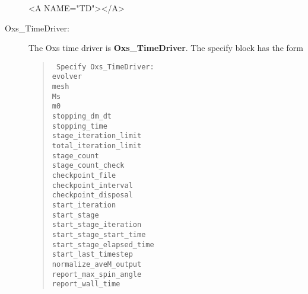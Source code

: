 \begin{description}
\begin{rawhtml}<A NAME="TD"></A>\end{rawhtml}%
%
\item[Oxs\_TimeDriver:\label{item:TimeDriver}]
The Oxs time driver is \textbf{Oxs\_TimeDriver}.  The specify block has
the form
\begin{latexonly}
\begin{quote}\tt
Specify Oxs\_TimeDriver: \ocb\\
 \bi evolver \\
 \bi mesh \\
 \bi Ms \\
 \bi m0 \\
 \bi stopping\_dm\_dt \\
 \bi stopping\_time \\
 \bi stage\_iteration\_limit \\
 \bi total\_iteration\_limit \\
 \bi stage\_count \\
 \bi stage\_count\_check \\
 \bi checkpoint\_file \\
 \bi checkpoint\_interval \\
 \bi checkpoint\_disposal \\
 \bi start\_iteration \\
 \bi start\_stage \\
 \bi start\_stage\_iteration \\
 \bi start\_stage\_start\_time \\
 \bi start\_stage\_elapsed\_time \\
 \bi start\_last\_timestep \\
 \bi normalize\_aveM\_output \\
 \bi report\_max\_spin\_angle \\
 \bi report\_wall\_time \\
\ccb
\end{quote}

\end{latexonly}
\end{description}
